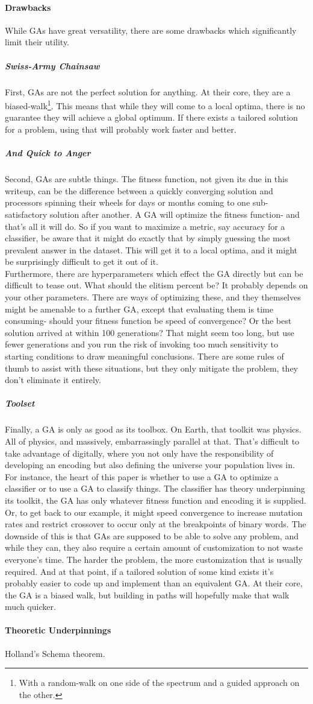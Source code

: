 \paragraph{Drawbacks}
While GAs have great versatility, there are some drawbacks which significantly limit their utility.
\subparagraph{Swiss-Army Chainsaw}
First, GAs are not the perfect solution for anything.  At their core, they are a biased-walk\footnote{With a random-walk on one side of the spectrum and a guided approach on the other.}.  This means that while they will come to a local optima, there is no guarantee they will achieve a global optimum.  If there exists a tailored solution for a problem, using that will probably work faster and better.
\subparagraph{And Quick to Anger}
Second, GAs are subtle things.  The fitness function, not given its due in this writeup, can be the difference between a quickly converging solution and processors spinning their wheels for days or months coming to one sub-satisfactory solution after another.  A GA will optimize the fitness function- and that's all it will do.  So if you want to maximize a metric, say accuracy for a classifier, be aware that it might do exactly that by simply guessing the most prevalent answer in the dataset.  This will get it to a local optima, and it might be surprisingly difficult to get it out of it.\\
Furthermore, there are hyperparameters which effect the GA directly but can be difficult to tease out.  What should the elitism percent be?  It probably depends on your other parameters.  There are ways of optimizing these, and they themselves might be amenable to a further GA, except that evaluating them is time consuming- should your fitness function be speed of convergence?  Or the best solution arrived at within 100 generations?  That might seem too long, but use fewer generations and you run the risk of invoking too much sensitivity to starting conditions to draw meaningful conclusions.  There are some rules of thumb to assist with these situations, but they only mitigate the problem, they don't eliminate it entirely.
\subparagraph{Toolset}
Finally, a GA is only as good as its toolbox.  On Earth, that toolkit was physics.  All of physics, and massively, embarrassingly parallel at that.  That's difficult to take advantage of digitally, where you not only have the responsibility of developing an encoding but also defining the universe your population lives in.  For instance, the heart of this paper is whether to use a GA to optimize a classifier or to use a GA to classify things.  The classifier has theory underpinning its toolkit, the GA has only whatever fitness function and encoding it is supplied.  Or, to get back to our example, it might speed convergence to increase mutation rates and restrict crossover to occur only at the breakpoints of binary words.  The downside of this is that GAs are supposed to be able to solve any problem, and while they can, they also require a certain amount of customization to not waste everyone's time.  The harder the problem, the more customization that is usually required.  And at that point, if a tailored solution of some kind exists it's probably easier to code up and implement than an equivalent GA.  At their core, the GA is a biased walk, but building in paths will hopefully make that walk much quicker.
\paragraph{Theoretic Underpinnings}
Holland's Schema theorem.  
\pagebreak
